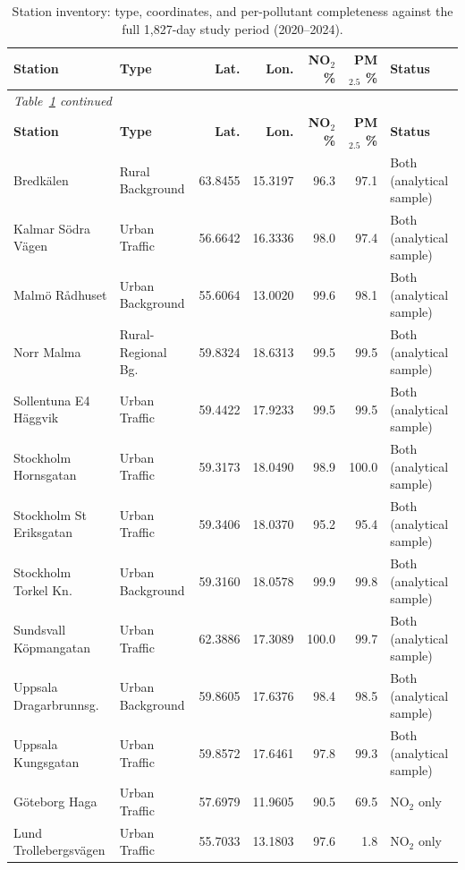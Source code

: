 \documentclass[11pt,a4paper]{article}
\begin{document}
\begin{longtable}{p{4.1cm}p{2.6cm}rrrrp{2.7cm}}
\caption{Station inventory: type, coordinates, and per-pollutant completeness against the full 1{,}827-day study period (2020--2024).}
\label{tab:station-inventory} \\
\toprule
\textbf{Station} & \textbf{Type} & \textbf{Lat.} & \textbf{Lon.} & \textbf{NO$_2$ \%} & \textbf{PM$_{2.5}$ \%} & \textbf{Status} \\
\midrule
\endfirsthead
\multicolumn{7}{l}{\textit{Table~\ref{tab:station-inventory} continued}} \\
\toprule
\textbf{Station} & \textbf{Type} & \textbf{Lat.} & \textbf{Lon.} & \textbf{NO$_2$ \%} & \textbf{PM$_{2.5}$ \%} & \textbf{Status} \\
\midrule
\endhead
\bottomrule
\endfoot
Bredkälen & Rural Background & 63.8455 & 15.3197 & 96.3 & 97.1 & Both (analytical sample) \\
Kalmar Södra Vägen & Urban Traffic & 56.6642 & 16.3336 & 98.0 & 97.4 & Both (analytical sample) \\
Malmö Rådhuset & Urban Background & 55.6064 & 13.0020 & 99.6 & 98.1 & Both (analytical sample) \\
Norr Malma & Rural-Regional Bg. & 59.8324 & 18.6313 & 99.5 & 99.5 & Both (analytical sample) \\
Sollentuna E4 Häggvik & Urban Traffic & 59.4422 & 17.9233 & 99.5 & 99.5 & Both (analytical sample) \\
Stockholm Hornsgatan & Urban Traffic & 59.3173 & 18.0490 & 98.9 & 100.0 & Both (analytical sample) \\
Stockholm St Eriksgatan & Urban Traffic & 59.3406 & 18.0370 & 95.2 & 95.4 & Both (analytical sample) \\
Stockholm Torkel Kn. & Urban Background & 59.3160 & 18.0578 & 99.9 & 99.8 & Both (analytical sample) \\
Sundsvall Köpmangatan & Urban Traffic & 62.3886 & 17.3089 & 100.0 & 99.7 & Both (analytical sample) \\
Uppsala Dragarbrunnsg. & Urban Background & 59.8605 & 17.6376 & 98.4 & 98.5 & Both (analytical sample) \\
Uppsala Kungsgatan & Urban Traffic & 59.8572 & 17.6461 & 97.8 & 99.3 & Both (analytical sample) \\
Göteborg Haga & Urban Traffic & 57.6979 & 11.9605 & 90.5 & 69.5 & NO$_2$ only \\
Lund Trollebergsvägen & Urban Traffic & 55.7033 & 13.1803 & 97.6 & 1.8 & NO$_2$ only \\

\end{longtable}
\end{document}
